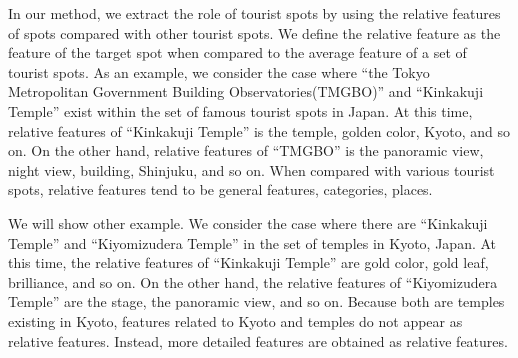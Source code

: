 \documentclass[journal]{IAENGtran}
\begin{document}
In our method, we extract the role of tourist spots by using the relative features of spots compared with other tourist spots.
We define the relative feature as the feature of the target spot when compared to the average feature of a set of tourist spots.
As an example, we consider the case where ``the Tokyo Metropolitan Government Building Observatories(TMGBO)'' and ``Kinkakuji Temple'' exist within the set of famous tourist spots in Japan.
At this time, relative features of ``Kinkakuji Temple'' is the temple, golden color, Kyoto, and so on.
On the other hand, relative features of ``TMGBO'' is the panoramic view, night view, building, Shinjuku, and so on.
When compared with various tourist spots, relative features tend to be general features, categories, places.

We will show other example.
We consider the case where there are ``Kinkakuji Temple'' and ``Kiyomizudera Temple'' in the set of temples in Kyoto, Japan.
At this time, the relative features of ``Kinkakuji Temple'' are gold color, gold leaf, brilliance, and so on.
On the other hand, the relative features of ``Kiyomizudera Temple'' are the stage, the panoramic view, and so on.
Because both are temples existing in Kyoto, features related to Kyoto and temples do not appear as relative features.
Instead, more detailed features are obtained as relative features.
\end{document}
